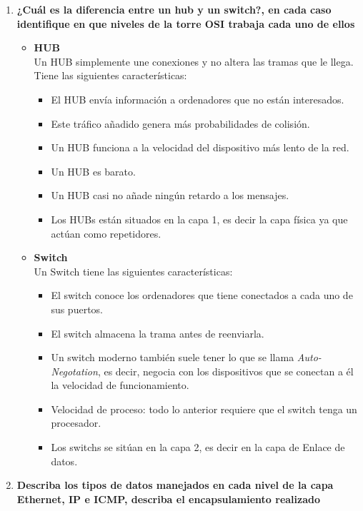 \documentclass[a4paper,12pt]{article}
\begin{document}
\begin{enumerate}
 \item \textbf{¿Cuál es la diferencia entre un hub y un switch?, en cada caso identifique en que niveles de la torre OSI trabaja cada uno de ellos}
 \begin{itemize}
  \item \textbf{HUB} \\
  Un HUB simplemente une conexiones y no altera las tramas que le llega. Tiene las siguientes características:
  \begin{itemize}
   \item El HUB envía información a ordenadores que no están interesados.
   \item Este tráfico añadido genera más probabilidades de colisión.
   \item Un HUB funciona a la velocidad del dispositivo más lento de la red.
   \item Un HUB es barato.
   \item Un HUB casi no añade ningún retardo a los mensajes. 
   \item Los HUBs están situados en la capa 1, es decir la capa física ya que actúan como repetidores. 
  \end{itemize}
  \item \textbf{Switch} \\
  Un Switch tiene las siguientes características:
  \begin{itemize}
   \item El switch conoce los ordenadores que tiene conectados a cada uno de sus puertos.
   \item El switch almacena la trama antes de reenviarla.
   \item Un switch moderno también suele tener lo que se llama \textit{Auto-Negotation}, es decir, negocia con los dispositivos que se conectan a él la velocidad de funcionamiento.
   \item Velocidad de proceso: todo lo anterior requiere que el switch tenga un procesador.
   \item Los switchs se sitúan en la capa 2, es decir en la capa de Enlace de datos. 
  \end{itemize}
 \end{itemize}

 \item \textbf{Describa los tipos de datos manejados en cada nivel de la capa Ethernet, IP e ICMP, describa el encapsulamiento realizado}
 

\end{enumerate}
\end{document}
